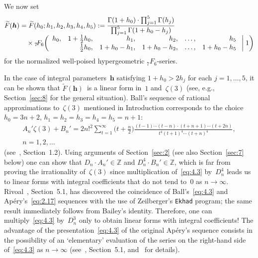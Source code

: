 \documentclass[a4paper,twoside]{article}
\let\topsmash\smash
\numberwithin{equation}{section}
\renewcommand{\[}{\lfloor}
\renewcommand{\]}{\rfloor}
\newcommand{\<}{\langle}
\renewcommand{\>}{\rangle}
\newcommand{\wt}{\widetilde}
\newcommand{\bh}{\boldsymbol h}
\begin{document}
We now set
\begin{equation}
\begin{split}
\wt F(\bh)
&=\wt F(h_0;h_1,h_2,h_3,h_4,h_5)
:=\frac{\Gamma(1+h_0)\cdot\prod_{j=1}^5\Gamma(h_j)}
{\topsmash{\prod_{j=1}^5\Gamma(1+h_0-h_j)}}
\\ &\quad\times
{}_7\!F_6\biggl(\begin{array}{rrrrrr}
h_0, & 1+\frac12h_0, &       h_1, &       h_2, & \dots, &       h_5 \\[1pt]
     &   \frac12h_0, & 1+h_0-h_1, & 1+h_0-h_2, & \dots, & 1+h_0-h_5
\end{array}\biggm|1\biggr)
\end{split}
\label{eq:4.2}
\end{equation}
for the normalized well-poised hypergeometric ${}_7\!F_6$-series.

In the case of integral parameters~$\bh$ satisfying $1+h_0>2h_j$
for each $j=1,\dots,5$, it can be shown that
$\wt F(\bh)$~is a linear form in~$1$ and~$\zeta(3)$
(see, e.g., Section~\ref{sec:8} for the general situation).
Ball's sequence of rational approximations to~$\zeta(3)$
mentioned in Introduction corresponds
to the choice $h_0=3n+2$, $h_1=h_2=h_3=h_4=h_5=n+1$:
\begin{equation}
\begin{gathered}
A_n'\zeta(3)+B_n'
=2n!^2\sum_{t=1}^\infty\biggl(t+\frac n2\biggr)
\frac{(t-1)\dotsb(t-n)\cdot(t+n+1)\dotsb(t+2n)}
{t^4(t+1)^4\dotsb(t+n)^4},
\\
n=1,2,\dots
\end{gathered}
\label{eq:4.3}
\end{equation}
(see~\cite{Ri3}, Section~1.2). Using arguments of Section~\ref{sec:2}
(see also Section~\ref{sec:7} below)
one can show that $D_n\cdot A_n'\in\mathbb Z$
and $D_n^4\cdot B_n'\in\mathbb Z$, which is far from proving
the irrationality of~$\zeta(3)$ since
multiplication of~\eqref{eq:4.3} by~$D_n^4$ leads us to linear
forms with integral coefficients that do not tend to~$0$ as $n\to\infty$.
Rivoal~\cite{Ri3}, Section~5.1, has discovered the coincidence
of Ball's~\eqref{eq:4.3} and Ap\'ery's~\eqref{eq:2.17} sequences
with the use of Zeilberger's {\tt Ekhad} program; the same
result immediately follows from Bailey's identity. Therefore,
one can multiply~\eqref{eq:4.3} by~$D_n^3$ only to obtain
linear forms with integral coefficients! The advantage of
the presentation~\eqref{eq:4.3} of the original Ap\'ery's sequence
consists in the possibility of an `elementary' evaluation of
the series on the right-hand side of~\eqref{eq:4.3} as $n\to\infty$
(see~\cite{Ri3}, Section~5.1, and~\cite{BR} for details).
\end{document}

